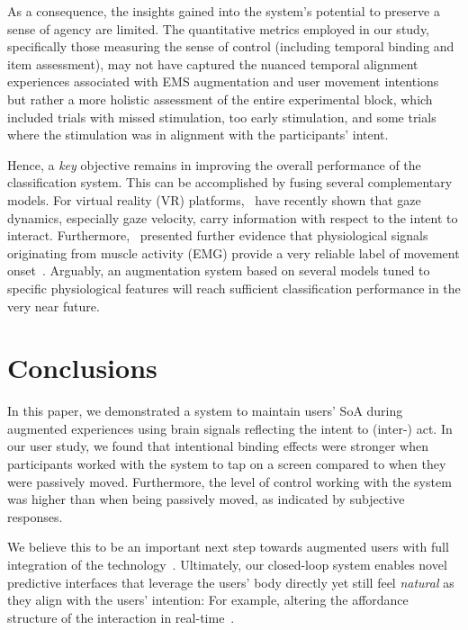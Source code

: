 As a consequence, the insights gained into the system's potential to preserve a sense of agency are limited. The quantitative metrics employed in our study, specifically those measuring the sense of control (including temporal binding and item assessment), may not have captured the nuanced temporal alignment experiences associated with EMS augmentation and user movement intentions but rather a more holistic assessment of the entire experimental block, which included trials with missed stimulation, too early stimulation, and some trials where the stimulation was in alignment with the participants' intent.

Hence, a \textit{key} objective remains in improving the overall performance of the classification system. This can be accomplished by fusing several complementary models. For virtual reality (VR) platforms,~\citet{David-John2021-vg} have recently shown that gaze dynamics, especially gaze velocity, carry information with respect to the intent to interact. Furthermore,~\citet{Nguyen2023-me} presented further evidence that physiological signals originating from muscle activity (EMG) provide a very reliable label of movement onset~\cite{Nguyen2023-me}. Arguably, an augmentation system based on several models tuned to specific physiological features will reach sufficient classification performance in the very near future.

\section{Conclusions}
In this paper, we demonstrated a system to maintain users' SoA during augmented experiences using brain signals reflecting the intent to (inter-) act. In our user study, we found that intentional binding effects were stronger when participants worked with the system to tap on a screen compared to when they were passively moved. Furthermore, the level of control working with the system was higher than when being passively moved, as indicated by subjective responses.

We believe this to be an important next step towards augmented users with full integration of the technology~\cite{Mueller2020-dl}. Ultimately, our closed-loop system enables novel predictive interfaces that leverage the users' body directly yet still feel \textit{natural} as they align with the users' intention: For example, altering the affordance structure of the interaction in real-time~\cite{Gehrke2022-kz, Lopes2015-ze, Nataraj2020-wm}.


